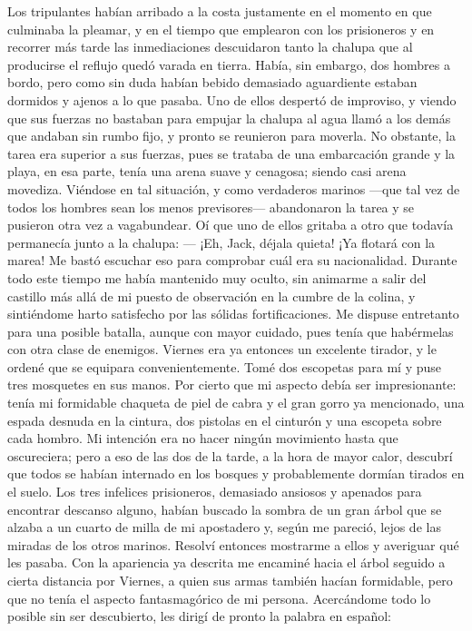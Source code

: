 \documentclass{novela}
\begin{document}
    Los tripulantes habían arribado a la costa justamente en el momento en que culminaba la pleamar, y en el tiempo que emplearon con los prisioneros y en recorrer más tarde las inmediaciones descuidaron tanto la chalupa que al producirse el reflujo quedó varada en tierra.
    Había, sin embargo, dos hombres a bordo, pero como sin duda habían bebido demasiado aguardiente estaban dormidos y ajenos a lo que pasaba. Uno de ellos despertó de improviso, y viendo que sus fuerzas no bastaban para empujar la chalupa al agua llamó a los demás que andaban sin rumbo fijo, y pronto se reunieron para moverla. No obstante, la tarea era superior a sus fuerzas, pues se trataba de una embarcación grande y la playa, en esa parte, tenía una arena suave y cenagosa; siendo casi arena movediza.
    Viéndose en tal situación, y como verdaderos marinos —que tal vez de todos los hombres sean los menos previsores— abandonaron la tarea y se pusieron otra vez a vagabundear. Oí que uno de ellos gritaba a otro que todavía permanecía junto a la chalupa:
    — ¡Eh, Jack, déjala quieta! ¡Ya flotará con la marea! Me bastó escuchar eso para comprobar cuál era su nacionalidad.
    Durante todo este tiempo me había mantenido muy oculto, sin animarme a salir del castillo más allá de mi puesto de observación en la cumbre de la colina, y sintiéndome harto satisfecho por las sólidas fortificaciones.
    Me dispuse entretanto para una posible batalla, aunque con mayor cuidado, pues tenía que habérmelas con otra clase de enemigos. Viernes era ya entonces un excelente tirador, y le ordené que se equipara convenientemente. Tomé dos escopetas para mí y puse tres mosquetes en sus manos. Por cierto que mi aspecto debía ser impresionante: tenía mi formidable chaqueta de piel de cabra y el gran gorro ya mencionado, una espada desnuda en la cintura, dos pistolas en el cinturón y una escopeta sobre cada hombro.
    Mi intención era no hacer ningún movimiento hasta que oscureciera; pero a eso de las dos de la tarde, a la hora de mayor calor, descubrí que todos se habían internado en los bosques y probablemente dormían tirados en el suelo. Los tres infelices prisioneros, demasiado ansiosos y apenados para encontrar descanso alguno, habían buscado la sombra de un gran árbol que se alzaba a un cuarto de milla de mi apostadero y, según me pareció, lejos de las miradas de los otros marinos.
    Resolví entonces mostrarme a ellos y averiguar qué les pasaba. Con la apariencia ya descrita me encaminé hacia el árbol seguido a cierta distancia por Viernes, a quien sus armas también hacían formidable, pero que no tenía el aspecto fantasmagórico de mi persona. Acercándome todo lo posible sin ser descubierto, les dirigí de pronto la palabra en español:
\end{document}
